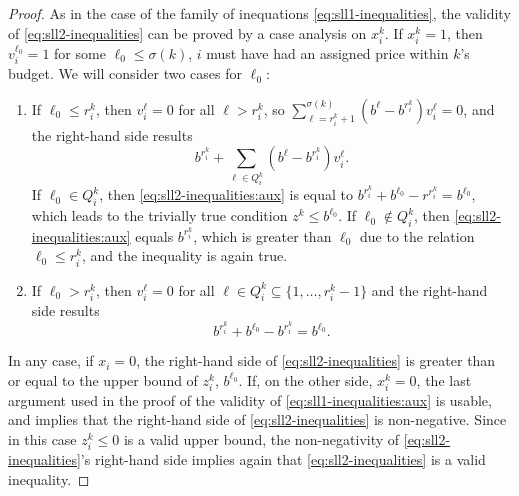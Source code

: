 \begin{proof}
    As in the case of the family of inequations \eqref{eq:sll1-inequalities},
    the validity of \eqref{eq:sll2-inequalities} can be proved by a case
    analysis on $x_i^k$. If $x_i^k = 1$, then $v_i^{\ell_0} = 1$ for some
    $\ell_0 \leq \sigma(k)$, $i$ must have had an assigned price within $k$'s
    budget. We will consider two cases for $\ell_0$:
    \begin{enumerate}
        
        \item %
	    If $\ell_0 \leq r_i^k$, then $v_i^\ell = 0$ for all $\ell > r_i^k$,
	    so
	    $
	        \sum_{\ell = r_i^k + 1}^{\sigma(k)}
	            \left(b^\ell - b^{r_i^k}\right)v_i^\ell
	        = 0
	    $,
	    and the right-hand side results
	    \begin{equation}
	        b^{r_i^k}
	        + \sum_{\ell \in Q_i^k}
	            \left(b^\ell - b^{r_i^k}\right) v_i^\ell.
	        \label{eq:sll2-inequalities:aux}
	    \end{equation}
	    If $\ell_0 \in Q_i^k$, then \eqref{eq:sll2-inequalities:aux} is
	    equal to
	    $
	        b^{r_i^k} + b^{\ell_0} - r^{r_i^k} = b^{\ell_0}
	    $,
	    which leads to the trivially true condition $z^k \leq b^{\ell_0}$.
	    If $\ell_0 \not\in Q_i^k$, then \eqref{eq:sll2-inequalities:aux}
	    equals $b^{r_i^k}$, which is greater than $\ell_0$ due to the
	    relation $\ell_0 \leq r_i^k$, and the inequality is again true.
        \item %
            If $\ell_0 > r_i^k$, then $v_i^\ell = 0$ for all
            $
                \ell \in Q_i^k \subseteq \{ 1, \ldots, r_i^k - 1 \}
            $
            and the right-hand side results
            \[
                b^{r_i^k} + b^{\ell_0} - b^{r_i^k} = b^{\ell_0}.
            \]

    \end{enumerate}
    In any case, if $x_i=0$, the right-hand side of \eqref{eq:sll2-inequalities}
    is greater than or equal to the upper bound of $z_i^k$, $b^{\ell_0}$. If, on
    the other side, $x_i^k = 0$, the last argument used in the proof of the
    validity of \ref{eq:sll1-inequalities:aux} is usable, and implies that the
    right-hand side of \eqref{eq:sll2-inequalities} is non-negative. Since in
    this case $z_i^k \leq 0$ is a valid upper bound, the non-negativity of
    \eqref{eq:sll2-inequalities}'s right-hand side implies again that
    \eqref{eq:sll2-inequalities} is a valid inequality.
\end{proof}

